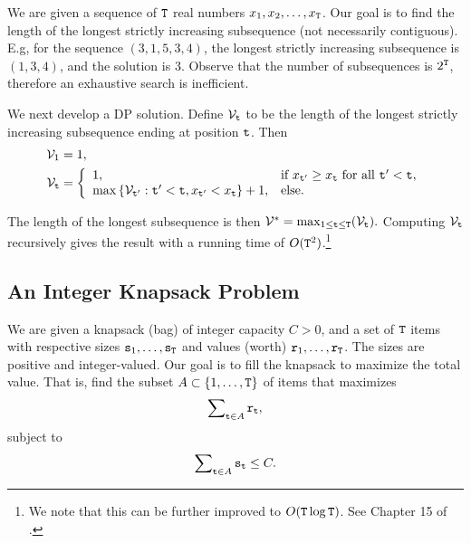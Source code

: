 We are given a sequence of ${\tt T}$ real numbers ${x_1},{x_2}, \ldots ,{x_{{\tt T}}}$. Our goal is to find the length of the longest strictly increasing subsequence (not necessarily contiguous).
E.g, for the sequence $(3,1,5,3,4)$, the longest strictly increasing subsequence is $(1,3,4)$, and the solution is $3$.
Observe that the number of subsequences is ${2^{{\tt T}}}$, therefore an exhaustive search is inefficient.

We next develop a DP solution. Define  ${\mathcal{V}_{{\tt t}}}$ to be the length of the longest strictly increasing subsequence ending at position ${\tt t}$.
Then 
\begin{equation*}
\begin{split}
    {\mathcal{V}_1} &= 1, \\
    \mathcal{V}_{{\tt t}} &= \left\{\begin{array}{ll}
  1, & \text{if } x_{{\tt t}'}\geq x_{{\tt t}} \text{ for all } {\tt t}'<{\tt t}, \\
  \max \left\{{\mathcal{V}_{{\tt t}'} : {\tt t}'<{\tt t}, x_{{\tt t}'}<x_{{\tt t}}}\right\}+1,& \text{else}. \end{array}\right. 
\end{split}
\end{equation*}

The length of the longest subsequence is then $\mathcal{V}^* = {\max _{1 \le {\tt t} \le {\tt T}}}({\mathcal{V}_{{\tt t}}}).$ 
Computing ${\mathcal{V}_{{\tt t}}}$ recursively gives the result with a running time of $O({{\tt T}^2})$.\footnote{We note that this can be further improved to $O({\tt T}\log {\tt T})$. See Chapter 15 of
\cite{BookCormenLRS2009}.}


\subsection*{An Integer Knapsack Problem}

We are given a knapsack (bag) of integer capacity $C > 0$, and a set of ${\tt T}$ items with respective sizes ${{\tt s}_1}, \ldots ,{{\tt s}_{{\tt T}}}$ and values (worth) ${{\tt r}_1}, \ldots ,{{\tt r}_{{\tt T}}}$. The sizes are positive and integer-valued. Our goal is to fill the knapsack to maximize the total value. That is, find the subset $A \subset \{ 1, \ldots ,{\tt T}\} $ of items that maximizes \[\sum\nolimits_{{\tt t} \in A} {{{\tt r}_{{\tt t}}}} ,\] subject to  \[\sum\nolimits_{{\tt t} \in A} {{{\tt s}_{\tt t}}}  \le C.\]

